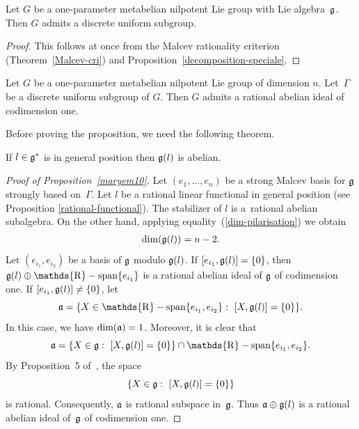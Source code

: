 \documentclass[pdftex]{sigma}
\newcommand{\set}[1]{\left\{#1\right\}}
\DeclareMathOperator{\spann}{\mathds{R}-span}
\def\hb#1{\hbox{#1}}
\def\hb #1{\hbox{#1}}
\def\hb#1{\hbox{#1}}
\def\dim#1{\hb{dim}(#1)}
\begin{document}
\begin{proposition}
Let $G$ be a one-parameter metabelian nilpotent Lie group with Lie
algebra~$\frak g$.
 Then $G$ admits a discrete uniform subgroup.
\end{proposition}

\begin{proof} This follows at once from
 the  Malcev  rationality criterion
 (Theorem~\ref{Malcev-cri}) and Proposition~\ref{decomposition-speciale}.
 \end{proof}

\begin{proposition}\label{maryem10}
Let $G$ be a one-parameter metabelian nilpotent Lie group of
dimension $n$.
 Let~$\Gamma $ be a discrete uniform subgroup of $G$. Then $G$ admits a
rational
 abelian ideal of codimension one.
\end{proposition}

Before proving the proposition, we need the following theorem.
\begin{theorem}
If $l\in \frak g^*$ is in general position then $\frak g(l)$ is
abelian.
\end{theorem}

\begin{proof}[Proof of Proposition~\ref{maryem10}]
Let $(e_1, \ldots, e_{n})$ be a strong Malcev basis for $\frak g$
strongly based on~$\Gamma$. Let $l$ be a rational  linear functional
in general position (see Proposition \ref{rational-functional}).
 The stabilizer of $l$ is a~rational abelian  subalgebra. On the other hand, applying equality~(\ref{dim-pilarisation}) we obtain
\begin{gather}\label{dim-stab}
\dim{\frak g(l)}=
 n-2.
 \end{gather}
  Let $(e_{i_1}, e_{i_2})$  be a basis of
$\frak g$ modulo $\frak g(l)$. If $ [ e_{i_1}, \frak g(l)] = \lbrace
0\rbrace$, then $\frak g(l)\oplus \spann\lbrace e_{i_1}\rbrace$  is
a rational abelian ideal of $\frak g$ of codimension one. If $ [
e_{i_1}, \frak g(l)] \ne \lbrace 0 \rbrace$, let
\[
\frak a = \lbrace X \in \spann\lbrace e_{i_1}, e_{i_2}\rbrace:\
[ X, \frak g(l)] =\set{0}\rbrace.
\] In this case, we have $\dim
{\frak a} =1$. Moreover, it is clear that
\[
 \frak a = \lbrace X \in \frak g:\
[ X, \frak g(l)] =\set{0}\rbrace\cap \spann\lbrace e_{i_1},
e_{i_2}\rbrace.
\]
 By Proposition~5 of~\cite{Ghorbel1}, the space
\[
\lbrace X \in \frak g:\
[ X, \frak g(l)] =\set{0}\rbrace
\] is rational. Consequently, $\frak
a$ is rational subspace in~$\frak g$. Thus $\frak a \oplus \frak
g(l)$ is a rational abelian ideal of~$\frak g$ of codimension one.
\end{proof}
\end{document}
